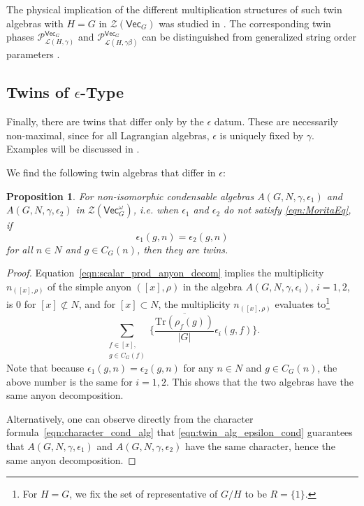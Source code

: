 \documentclass[aps,twocolumn,prx,floatfix,preprintnumbers, nofootinbib,10pt]{revtex4-2}
\numberwithin{equation}{section}
\newtheorem{proposition}[theorem]{Proposition}
\theoremstyle{definition}
\newcommand{\be}{\begin{equation}}
\newcommand{\ee}{\end{equation}}
\newcommand{\cL}{\mathcal{L}}
\newcommand{\cP}{\mathcal{P}}
\newcommand{\cZ}{\mathcal{Z}}
\newcommand{\Tr}{\text{Tr}}
\renewcommand{\Vec}{\mathsf{Vec}}
\renewcommand{\ol}{\overline}
\renewcommand{\ol}{\overline}
\begin{document}
The physical implication of the different multiplication structures of such twin algebras with $H=G$ in $\cZ(\Vec_G)$ was studied in \cite{Pollmann:2012,Kobayashi:2025pxs, Kobayashi:2025ykb}.
The corresponding twin phases $\cP^{\Vec_G}_{\cL(H,\gamma)}$ and $\cP^{\Vec_G}_{\cL(H,\gamma\beta)}$ can be distinguished from generalized string order parameters \cite{Pollmann:2012}.






\subsection{Twins of $\epsilon$-Type}
\label{sec:twin_alg_epsilon}

Finally, there are twins that differ only by the $\epsilon$ datum. 
These are necessarily non-maximal, since for all Lagrangian algebras, $\epsilon$ is uniquely fixed by $\gamma$. Examples will be discussed in .

We find the following twin algebras that differ in $\epsilon$:
\begin{proposition}
\label{prop:twins-epsilon}
    For non-isomorphic condensable algebras $A(G, N, \gamma, \epsilon_1)$ and $A(G, N, \gamma, \epsilon_2)$ in $\cZ(\Vec_G^\omega)$, i.e. when $\epsilon_{1}$ and $\epsilon_{2}$ do not satisfy \eqref{eqn:MoritaEq}, if 
    \be
    \label{eqn:twin_alg_epsilon_cond}
        \epsilon_1(g,n)=\epsilon_2(g,n)
    \ee
    for all $n\in N$ and $g\in C_G(n)$, then they are twins.
\end{proposition}
\begin{proof}
    Equation~\eqref{eqn:scalar_prod_anyon_decom} implies the multiplicity $n_{([x], \rho)}$ of the simple anyon $([x],\rho)$ in the algebra $A(G, N, \gamma, \epsilon_i)$, $i=1,2$, is $0$ for $[x]\not\subset N$, and for $[x]\subset N$, the multiplicity $n_{([x], \rho)}$ evaluates to\footnote{For $H=G$, we fix the set of representative of $G/H$ to be $R=\{1\}$.}
    \be
        \sum_{\substack{f\in [x],\\ g\in C_G(f)}} \biggl\{ \frac{\ol{\Tr(\rho_{f}(g))}}{|G|} \epsilon_i(g,f)\biggr\}.
    \ee
    Note that because $\epsilon_1(g,n)=\epsilon_2(g,n)$ for any $n\in N$ and $g\in C_G(n)$, the above number is the same for $i=1,2$. This shows that the two algebras have the same anyon decomposition.

    Alternatively, one can observe directly from the character formula~\eqref{eqn:character_cond_alg} that \eqref{eqn:twin_alg_epsilon_cond} guarantees that $A(G, N, \gamma, \epsilon_1)$ and $A(G, N, \gamma, \epsilon_2)$ have the same character, hence the same anyon decomposition.
\end{proof}
\end{document}
